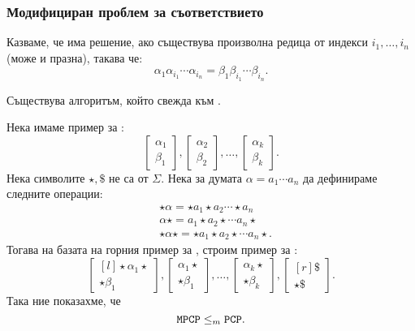 \subsubsection*{Модифициран проблем за съответствието }

Казваме, че \MPCP има решение, ако съществува произволна редица от индекси $i_1,\dots,i_n$ (може и празна), такава че:
\[\alpha_1\alpha_{i_1}\cdots\alpha_{i_n} = \beta_1\beta_{i_1}\cdots\beta_{i_n}.\]

\begin{lemma}
  Съществува алгоритъм, който свежда \MPCP към \PCP.
\end{lemma}
\begin{hint}
  Нека имаме пример за \MPCP:
  \[\begin{bmatrix} \alpha_1\\ \beta_1\end{bmatrix},\begin{bmatrix} \alpha_2\\ \beta_2\end{bmatrix},\dots,\begin{bmatrix} \alpha_k\\ \beta_k\end{bmatrix} .\]
  Нека символите $\star,\$$ не са от $\Sigma$.
  Нека за думата $\alpha = a_1\cdots a_n$ да дефинираме следните операции:
  \begin{align*}
    & \star\alpha = \star a_1 \star a_2\cdots \star a_n\\
    & \alpha\star = a_1\star a_2\star\cdots a_n \star\\
    & \star\alpha\star = \star a_1\star a_2 \star \cdots a_n\star.
  \end{align*}
  Тогава на базата на горния пример за \MPCP, строим пример за \PCP:
  \[\begin{bmatrix*}[l] \star\alpha_1\star\\ \star\beta_1\end{bmatrix*},\begin{bmatrix} \alpha_1\star\\ \star \beta_1\end{bmatrix},\dots,\begin{bmatrix} \alpha_k\star\\ \star\beta_k\end{bmatrix},\begin{bmatrix*}[r] \$\\ \star\$\end{bmatrix*}.\]
  Така ние показахме, че
  \[\texttt{MPCP} \leq_m \texttt{PCP}.\]
\end{hint}

